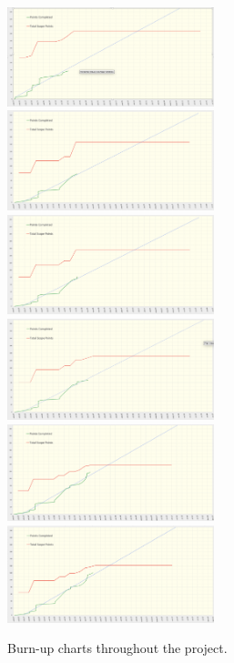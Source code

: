   \begin{figure}[H]
    \centering
    \includegraphics[width=6cm]{assets/outputs/burnups/01-16.png}
    \includegraphics[width=6cm]{assets/outputs/burnups/01-30.png}
    \includegraphics[width=6cm]{assets/outputs/burnups/02-05.png}
    \includegraphics[width=6cm]{assets/outputs/burnups/02-14.png}
    \includegraphics[width=6cm]{assets/outputs/burnups/02-27.png}
    \includegraphics[width=6cm]{assets/outputs/burnups/03-03.png}
    \caption{Burn-up charts throughout the project.}
    \label{fig:burnups}
  \end{figure}

  \newpage
